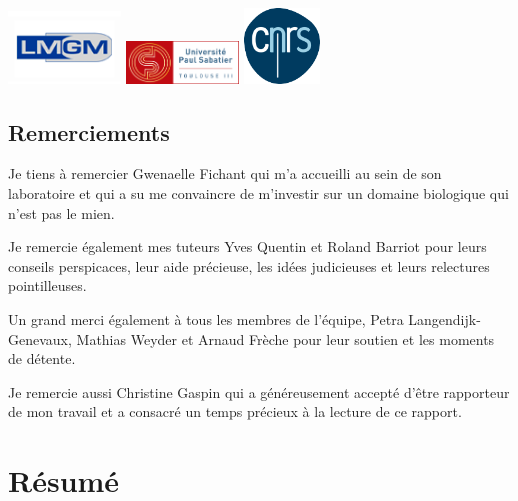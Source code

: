 \documentclass[12pt,a4paper]{report}
\begin{document}
\begin{titlepage}
\begin{sffamily}
\begin{center}
    \vfill   
    
  \includegraphics[width = 30mm]{figures/garde/lmgm_logo.png} \hfill
  \includegraphics[width = 30mm]{figures/garde/ups_logo.jpg} \hfill
  \includegraphics[width = 20mm]{figures/garde/cnrs_logo.png}

  \end{center}
  \end{sffamily}
\end{titlepage}

\begin{onehalfspace}

\chapter*{Remerciements}
\thispagestyle{empty}
Je tiens à remercier Gwenaelle Fichant qui m'a accueilli au sein de son laboratoire et qui a su me convaincre de m'investir sur un domaine biologique qui n'est pas le mien.

Je remercie également mes tuteurs Yves Quentin et Roland Barriot pour leurs conseils perspicaces, leur aide précieuse, les idées judicieuses et leurs relectures pointilleuses.
 
Un grand merci également à tous les membres de l'équipe, Petra
Langendijk-Genevaux, Mathias Weyder et Arnaud Frèche pour leur soutien et les moments de détente. 

Je remercie aussi Christine Gaspin qui a généreusement accepté d'être rapporteur de mon travail et a consacré un temps précieux à la lecture de ce rapport.

\end{onehalfspace}


\chapter*{Résumé}
\thispagestyle{empty}
\end{document}
